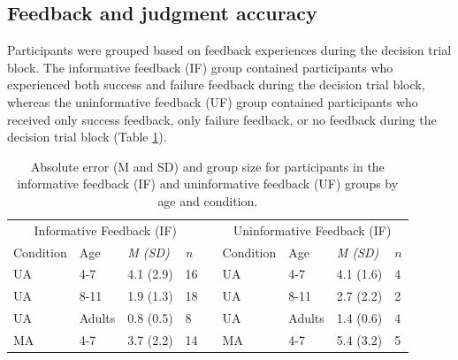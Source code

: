 \documentclass[a4paper,man,natbib,floatsintext,noextraspace]{apa6}
\begin{document}
\subsection{Feedback and judgment accuracy}

Participants were grouped based on feedback experiences during the decision trial block. The informative feedback (IF) group contained participants who experienced both success and failure feedback during the decision trial block, whereas the uninformative feedback (UF) group contained participants who received only success feedback, only failure feedback, or no feedback during the decision trial block (Table \ref{tab:1}). 

\begin{table}
\caption{Absolute error (M and SD) and group size for participants in the informative feedback (IF) and uninformative feedback (UF) groups by age and condition.}
\label{tab:1}
\begin{tabular}{@{}lllllllll@{}}
\multicolumn{4}{c}{Informative Feedback (IF)}                                                                                   &                       & \multicolumn{4}{c}{Uninformative Feedback (IF)}                                                                  \\ 
\multicolumn{1}{l}{Condition} & \multicolumn{1}{l}{Age} & \multicolumn{1}{l}{\textit{M (SD)}} & \multicolumn{1}{l}{\textit{n}} & \multicolumn{1}{l}{} & \multicolumn{1}{l}{Condition} & \multicolumn{1}{l}{Age} & \multicolumn{1}{l}{\textit{M (SD)}} & \multicolumn{1}{l}{$n$} \\ \midrule
UA                              & 4-7                      & 4.1 (2.9)                            & 16                              &                       & UA                             & 4-7                      & 4.1 (1.6)                   & 4                      \\
UA                              & 8-11                     & 1.9 (1.3)                            & 18                              &                       & UA                             & 8-11                     & 2.7 (2.2)                   & 2                      \\
UA                              & Adults                   & 0.8 (0.5)                            & 8                               &                       & UA                             & Adults                   & 1.4 (0.6)                   & 4                      \\
MA                              & 4-7                      & 3.7 (2.2)                            & 14                              &                       & MA                             & 4-7                      & 5.4 (3.2)                   & 5                      \\

\end{tabular}
\end{table}
\end{document}
